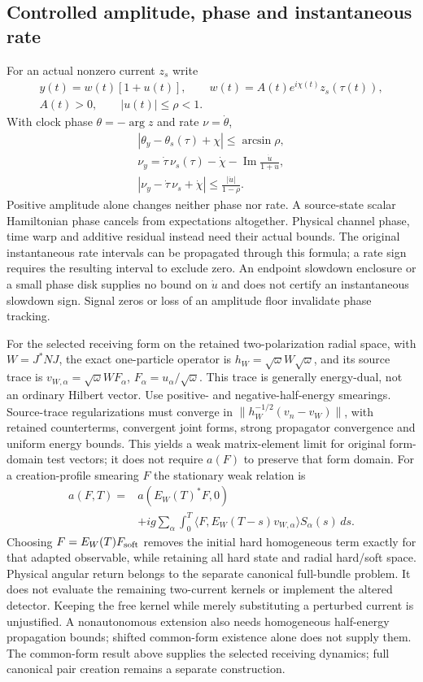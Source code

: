 \subsection{Controlled amplitude, phase and instantaneous rate}
For an actual nonzero current $z_s$ write
\[
 \begin{gathered}
 y(t)=w(t)[1+u(t)],\qquad
 w(t)=A(t)e^{i\chi(t)}z_s(\tau(t)),\\
 A(t)>0,\qquad |u(t)|\leq\rho<1.
 \end{gathered}
\]
With clock phase $\theta=-\arg z$ and rate $\nu=\dot\theta$,
\[
 \begin{gathered}
 |\theta_y-\theta_s(\tau)+\chi|\leq\arcsin\rho,\\
 \nu_y=\dot\tau\,\nu_s(\tau)-\dot\chi
       -\operatorname{Im}\frac{\dot u}{1+u},\\
 |\nu_y-\dot\tau\,\nu_s+\dot\chi|
       \leq\frac{|\dot u|}{1-\rho}.
 \end{gathered}
\]
Positive amplitude alone changes neither phase nor rate.  A source-state
scalar Hamiltonian phase cancels from expectations altogether.  Physical
channel phase, time warp and additive residual instead need their actual
bounds.  The original instantaneous rate intervals can be propagated through
this formula; a rate sign requires the resulting interval to exclude zero.
An endpoint slowdown enclosure or a small phase disk supplies no bound on
$\dot u$ and does not certify an instantaneous slowdown sign.  Signal zeros
or loss of an amplitude floor invalidate phase tracking.

For the selected receiving form on the retained two-polarization radial
space, with $W=J^*NJ$, the exact one-particle operator is
$h_W=\sqrt\omega W\sqrt\omega$, and its source trace is
$v_{W,\alpha}=\sqrt\omega W F_\alpha$,
$F_\alpha=u_\alpha/\sqrt\omega$.  This trace is generally energy-dual,
not an ordinary Hilbert vector.  Use positive- and negative-half-energy
smearings.  Source-trace regularizations must converge in
$\|h_W^{-1/2}(v_n-v_W)\|$, with retained counterterms, convergent joint
forms, strong propagator convergence and uniform energy bounds.
This yields a weak matrix-element limit for original form-domain test
vectors; it does not require $a(F)$ to preserve that form domain.
For a creation-profile smearing $F$ the stationary weak relation is
\[
 \begin{aligned}
 a(F,T)={}&a(E_W(T)^*F,0)\\
 &+ig\sum_\alpha\int_0^T
 \langle F,E_W(T-s)v_{W,\alpha}\rangle S_\alpha(s)\,ds .
 \end{aligned}
\]
Choosing $F=E_W(T)F_{\rm soft}$ removes the initial hard homogeneous term
exactly for that adapted observable, while retaining all hard state and
radial hard/soft space.  Physical angular return belongs to the separate
canonical full-bundle problem.  It does not evaluate the remaining two-current kernels
or implement the altered detector.  Keeping the free kernel while merely
substituting a perturbed current is unjustified.  A nonautonomous extension also needs homogeneous half-energy propagation
bounds; shifted common-form existence alone does not supply them.
The common-form result above supplies the selected receiving dynamics; full canonical pair
creation remains a separate construction.

